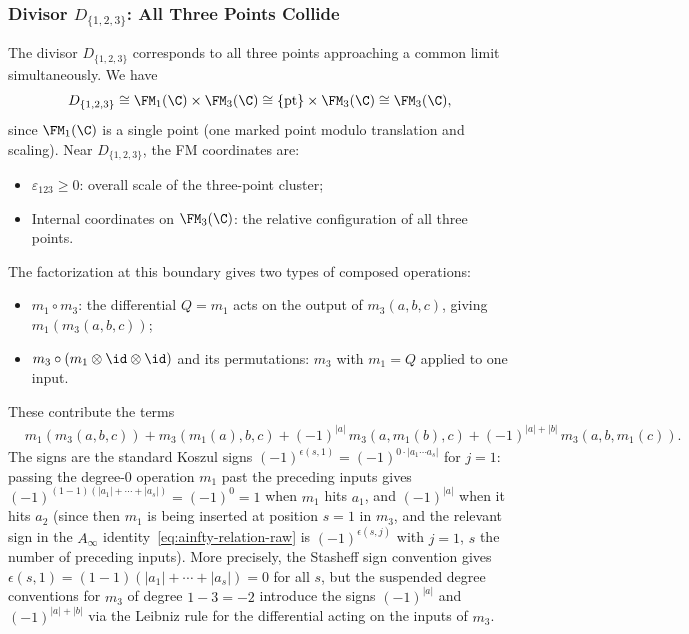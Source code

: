 \subsubsection{Divisor $D_{\{1,2,3\}}$: All Three Points Collide}

\begin{computation}[$D_{\{1,2,3\}}$ contribution]
\label{comp:D123}
The divisor $D_{\{1,2,3\}}$ corresponds to all three points approaching a common limit simultaneously. We have
\[
D_{\{1,2,3\}} \cong \FM_1(\C) \times \FM_3(\C) \cong \{\mathrm{pt}\} \times \FM_3(\C) \cong \FM_3(\C),
\]
since $\FM_1(\C)$ is a single point (one marked point modulo translation and scaling). Near $D_{\{1,2,3\}}$, the FM coordinates are:
\begin{itemize}
\item $\varepsilon_{123} \geq 0$: overall scale of the three-point cluster;
\item Internal coordinates on $\FM_3(\C)$: the relative configuration of all three points.
\end{itemize}
The factorization at this boundary gives two types of composed operations:
\begin{itemize}
\item $m_1 \circ m_3$: the differential $Q = m_1$ acts on the output of $m_3(a,b,c)$, giving $m_1(m_3(a,b,c))$;
\item $m_3 \circ (m_1 \otimes \id \otimes \id)$ and its permutations: $m_3$ with $m_1 = Q$ applied to one input.
\end{itemize}
These contribute the terms
\begin{align*}
&m_1(m_3(a,b,c)) + m_3(m_1(a), b, c) + (-1)^{|a|}\, m_3(a, m_1(b), c) + (-1)^{|a|+|b|}\, m_3(a, b, m_1(c)).
\end{align*}
The signs are the standard Koszul signs $(-1)^{\epsilon(s,1)} = (-1)^{0 \cdot |a_1 \cdots a_s|}$ for $j=1$: passing the degree-$0$ operation $m_1$ past the preceding inputs gives $(-1)^{(1-1)(|a_1|+\cdots+|a_s|)} = (-1)^0 = 1$ when $m_1$ hits $a_1$, and $(-1)^{|a|}$ when it hits $a_2$ (since then $m_1$ is being inserted at position $s=1$ in $m_3$, and the relevant sign in the $A_\infty$ identity~\eqref{eq:ainfty-relation-raw} is $(-1)^{\epsilon(s,j)}$ with $j=1$, $s$ the number of preceding inputs). More precisely, the Stasheff sign convention gives $\epsilon(s,1) = (1-1)(|a_1|+\cdots+|a_s|) = 0$ for all $s$, but the suspended degree conventions for $m_3$ of degree $1-3 = -2$ introduce the signs $(-1)^{|a|}$ and $(-1)^{|a|+|b|}$ via the Leibniz rule for the differential acting on the inputs of $m_3$.
\end{computation}

